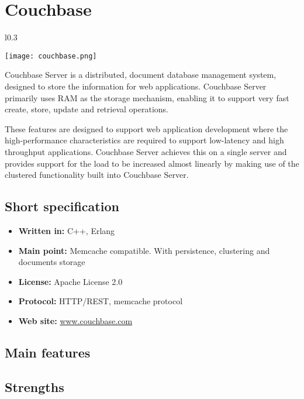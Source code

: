 \chapter{Couchbase}

\begin{wrapfigure}{l}{0.3\textwidth}
  \vspace{-100pt}
  \begin{center}
    \texttt{[image: couchbase.png]}
  \end{center}
  \vspace{-30pt}
\end{wrapfigure}
Couchbase Server is a distributed, document database management system, designed to store the information for web applications. Couchbase Server primarily uses RAM as the storage mechanism, enabling it to support very fast create, store, update and retrieval operations.

These features are designed to support web application development where the high-performance characteristics are required to support low-latency and high throughput applications. Couchbase Server achieves this on a single server and provides support for the load to be increased almost linearly by making use of the clustered functionality built into Couchbase Server.

\section{Short specification}

\begin{itemize}
  \item \textbf{Written in:} C++, Erlang
  \item \textbf{Main point:} Memcache compatible. With persistence, clustering and documents storage
  \item \textbf{License:} Apache License 2.0
  \item \textbf{Protocol:} HTTP/REST, memcache protocol
  \item \textbf{Web site:} \href{http://www.couchbase.com/}{www.couchbase.com}
\end{itemize}

\section{Main features}

\section{Strengths}

